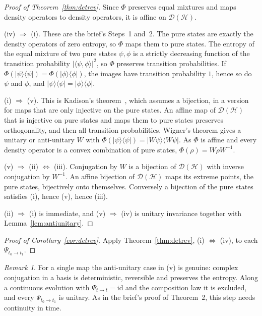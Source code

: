 \documentclass[11pt]{article}
\theoremstyle{definition}
\theoremstyle{remark}
\newtheorem{remark}[theorem]{Remark}
\begin{document}
\begin{proof}[Proof of Theorem~\ref{thm:detrev}]
  Since $\Phi$ preserves equal mixtures and maps density operators to density operators, it is
  affine on $\mathcal D(\mathcal H)$.

  (iv) $\Rightarrow$ (i). These are the brief's Steps~1 and~2. The pure states are exactly the
  density operators of zero entropy, so $\Phi$ maps them to pure states. The entropy of the equal
  mixture of two pure states $\psi, \phi$ is a strictly decreasing function of the transition
  probability $|\langle\psi,\phi\rangle|^2$, so $\Phi$ preserves transition probabilities. If
  $\Phi(|\psi\rangle\langle\psi|) = \Phi(|\phi\rangle\langle\phi|)$, the images have transition
  probability $1$, hence so do $\psi$ and $\phi$, and $|\psi\rangle\langle\psi| =
  |\phi\rangle\langle\phi|$.

  (i) $\Rightarrow$ (v). This is Kadison's theorem~\cite{kadison}, which assumes a bijection, in
  a version for maps that are only injective on the pure states. An affine map of $\mathcal D(\mathcal H)$ that is injective on pure states
  and maps them to pure states preserves orthogonality, and then all transition probabilities.
  Wigner's theorem gives a unitary or anti-unitary $W$ with $\Phi(|\psi\rangle\langle\psi|) =
  |W\psi\rangle\langle W\psi|$. As $\Phi$ is affine and every density operator is a convex
  combination of pure states, $\Phi(\rho) = W\rho W^{-1}$.

  (v) $\Rightarrow$ (ii) $\Leftrightarrow$ (iii). Conjugation by $W$ is a bijection of
  $\mathcal D(\mathcal H)$ with inverse conjugation by $W^{-1}$. An affine bijection of
  $\mathcal D(\mathcal H)$ maps its extreme points, the pure states, bijectively onto themselves.
  Conversely a bijection of the pure states satisfies (i), hence (v), hence (iii).

  (ii) $\Rightarrow$ (i) is immediate, and (v) $\Rightarrow$ (iv) is unitary invariance together
  with Lemma~\ref{lem:antiunitary}.
\end{proof}

\begin{proof}[Proof of Corollary~\ref{cor:detrev}]
  Apply Theorem~\ref{thm:detrev}, (i) $\Leftrightarrow$ (iv), to each $\Psi_{t_0\to t_1}$.
\end{proof}

\begin{remark}
  For a single map the anti-unitary case in (v) is genuine: complex conjugation in a basis is
  deterministic, reversible and preserves the entropy. Along a continuous evolution with
  $\Psi_{t\to t} = \mathrm{id}$ and the composition law it is excluded, and every
  $\Psi_{t_0\to t_1}$ is unitary. As in the brief's proof of Theorem~2, this step needs
  continuity in time.
\end{remark}
\end{document}
